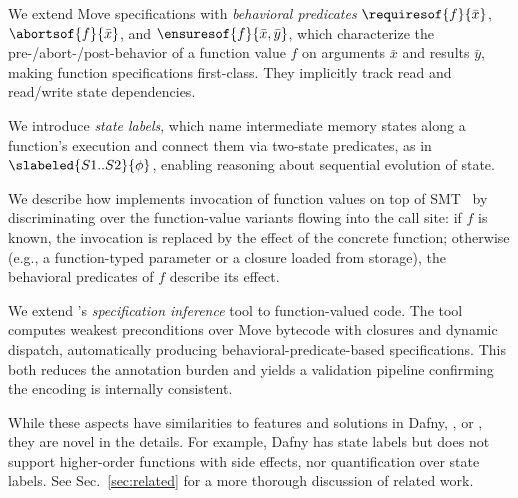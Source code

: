 \begin{Itemize}
    \item We extend Move specifications with \emph{behavioral predicates} $\requiresof{f}{\bar{x}}$, $\abortsof{f}{\bar{x}}$, and $\ensuresof{f}{\bar{x}, \bar{y}}$, which characterize the pre-/abort-/post-behavior of a function value $f$ on arguments $\bar{x}$ and results $\bar{y}$, making function specifications first-class. They implicitly track read and read/write state dependencies.

    \item We introduce \emph{state labels}, which name intermediate memory states along a function's execution and connect them via two-state predicates, as in $\slabeled{S1..S2}{\phi}$, enabling reasoning about sequential evolution of state.

    \item We describe how \MVP implements invocation of function values on top of SMT~\cite{SMTLib2010,z3} by discriminating over the function-value variants flowing into the call site: if $f$ is known, the invocation is replaced by the effect of the concrete function; otherwise (e.g., a function-typed parameter or a closure loaded from storage), the behavioral predicates of $f$ describe its effect.

    \item We extend \MVP's \emph{specification inference} tool \cite{GrieskampEtAl26Inf} to function-valued code.
    The tool computes weakest preconditions over Move bytecode with closures and dynamic dispatch, automatically producing behavioral-predicate-based specifications.
    This both reduces the annotation burden and yields a validation pipeline confirming the encoding is internally consistent.
\end{Itemize}

\noindent While these aspects have similarities to features and solutions in Dafny, \fstar, or \verus, they are novel in the details. For example, Dafny has state labels but does not support higher-order functions with side effects, nor quantification over state labels. See Sec.~\ref{sec:related} for a more thorough discussion of related work.


